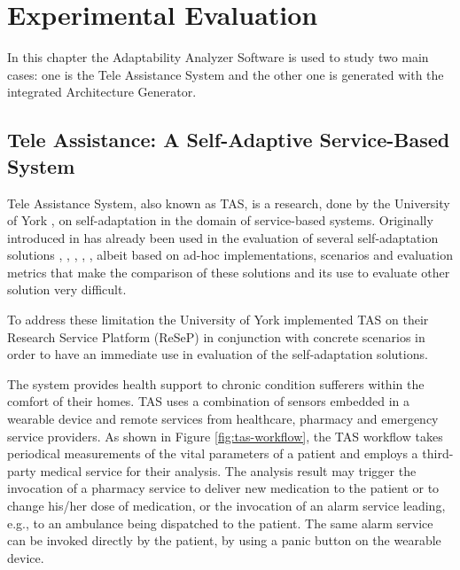 \chapter{Experimental Evaluation}
\label{cap:evaluation}

In this chapter the Adaptability Analyzer Software is used to study two main cases: one is the Tele Assistance System\cite{teleassist} and the other one is generated with the integrated Architecture Generator.

\section{Tele Assistance: A Self-Adaptive Service-Based System}
Tele Assistance System, also known as TAS, is a research, done by the University of York \cite{teleassist}, on self-adaptation in the domain of service-based systems. Originally introduced in \cite{valid-web-serv} has already been used in the evaluation of several self-adaptation solutions \cite{valid-web-serv}, \cite{sas-quant-ver}, \cite{dyn-qos-manage}, \cite{mod-evo-conf}, \cite{conq-compl}, albeit based on ad-hoc implementations, scenarios and evaluation metrics that make the comparison of these solutions and its use to evaluate other solution very difficult.

To address these limitation the University of York implemented TAS on their Research Service Platform (ReSeP) in conjunction with concrete scenarios in order to have an immediate use in evaluation of the self-adaptation solutions.

The system provides health support to chronic condition sufferers within the comfort of their homes. TAS uses a combination of sensors embedded in a wearable device and remote services from healthcare, pharmacy and emergency service providers. As shown in Figure \ref{fig:tas-workflow}, the TAS workflow takes periodical measurements of the vital parameters of a patient and employs a third-party medical service for their analysis. The analysis result may trigger the invocation of a pharmacy service to deliver new medication to the patient or to change his/her dose of medication, or the invocation of an alarm service leading, e.g., to an ambulance being dispatched to the patient. The same alarm service can be invoked directly by the patient, by using a panic button on the wearable device.


